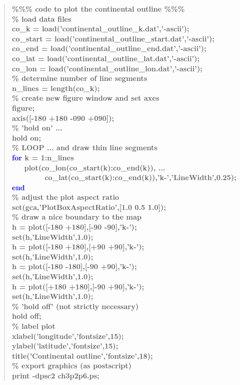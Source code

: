 \documentclass{tufte-book} %
\newenvironment{docspecbold}{\begin{quotation}\ttfamily\bfseries\parskip0pt\parindent0pt\ignorespaces}{\end{quotation}}
\begin{document}
\begin{docspecbold}
\textcolor[rgb]{0,0.501961,0}{\%\%\% code to plot the continental outline \%\%\%}
\\\textcolor[rgb]{0,0.501961,0}{\% load data files}
\\co\_k = load('continental\_outline\_k.dat','-ascii');
\\co\_start = load('continental\_outline\_start.dat','-ascii');
\\co\_end = load('continental\_outline\_end.dat','-ascii');
\\co\_lat = load('continental\_outline\_lat.dat','-ascii');
\\co\_lon = load('continental\_outline\_lon.dat','-ascii');
\\\textcolor[rgb]{0,0.501961,0}{\% determine number of line segments}
\\n\_lines = length(co\_k);
\\\textcolor[rgb]{0,0.501961,0}{\% create new figure window and set axes}
\\figure;
\\axis([-180 +180 -090 +090]);
\\\textcolor[rgb]{0,0.501961,0}{\% 'hold on' ...}
\\hold on;
\\\textcolor[rgb]{0,0.501961,0}{\% LOOP ... and draw thin line segments}
\\\textcolor{blue}{for} k = 1:n\_lines
\\ \ \ \ plot(co\_lon(co\_start(k):co\_end(k)), ...
\\ \ \ \ \ \ \ \ \ co\_lat(co\_start(k):co\_end(k)),'k-','LineWidth',0.25);
\\\textcolor{blue}{end}
\\\textcolor[rgb]{0,0.501961,0}{\% adjust the plot aspect ratio}
\\set(gca,'PlotBoxAspectRatio',[1.0 0.5 1.0]);
\\\textcolor[rgb]{0,0.501961,0}{\% draw a nice boundary to the map}
\\h = plot([-180 +180],[-90 -90],'k-');
\\set(h,'LineWidth',1.0);
\\h = plot([-180 +180],[+90 +90],'k-');
\\set(h,'LineWidth',1.0);
\\h = plot([-180 -180],[-90 +90],'k-');
\\set(h,'LineWidth',1.0);
\\h = plot([+180 +180],[-90 +90],'k-');
\\set(h,'LineWidth',1.0);
\\\textcolor[rgb]{0,0.501961,0}{\% 'hold off' (not strictly necessary)}
\\hold off;
\\\textcolor[rgb]{0,0.501961,0}{\% label plot}
\\xlabel('longitude','fontsize',15);
\\ylabel('latitude','fontsize',15);
\\title('Continental outline','fontsize',18);
\\\textcolor[rgb]{0,0.501961,0}{\% export graphics (as postscript)}
\\print -dpsc2 ch3p2p6.ps;
\end{docspecbold}
\end{document}
